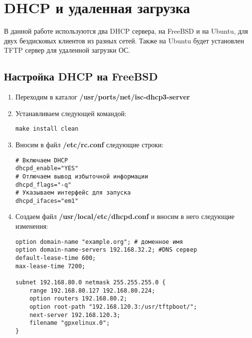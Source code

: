 \documentclass[14pt,a4paper,report]{report}
\begin{document}
\section{DHCP и удаленная загрузка}
В данной работе используются два DHCP сервера, на FreeBSD и на Ubuntu, для двух бездисковых клиентов из разных сетей. Также на Ubuntu будет установлен TFTP сервер для удаленной загрузки ОС.
\subsection{Настройка DHCP на FreeBSD}
\begin{enumerate}
\item Переходим в каталог \textbf{/usr/ports/net/isc-dhcp3-server}
\item Устанавливаем следующей командой:
\begin{lstlisting}[language={}]
make install clean
\end{lstlisting}
\item Вносим в файл \textbf{/etc/rc.conf} следующие строки:
\begin{lstlisting}[language={}]
# Включаем DHCP
dhcpd_enable="YES"
# Отлючаем вывод избыточной информации
dhcpd_flags="-q" 
# Указываем интерфейс для запуска
dhcpd_ifaces="em1" 
\end{lstlisting}
\item Создаем файл \textbf{/usr/local/etc/dhcpd.conf} и вносим в него следующие изменения:
\begin{lstlisting}[language={}]
option domain-name "example.org"; # доменное имя
option domain-name-servers 192.168.32.2; #DNS сервер
default-lease-time 600; 
max-lease-time 7200; 

subnet 192.168.80.0 netmask 255.255.255.0 {
    range 192.168.80.127 192.168.80.224;
    option routers 192.168.80.2;
    option root-path "192.168.120.3:/usr/tftpboot/";
    next-server 192.168.120.3;
    filename "gpxelinux.0";
}
\end{lstlisting}
\end{enumerate}
\end{document}

